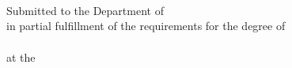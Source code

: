 \begin{titlepage}
    \begin{addmargin}[-1cm]{-3cm}
    \begin{center}
        \large

        \hfill

        \vfill

        \begingroup
            \color{CTtitle}{\LARGE \spacedallcaps{\myTitle}} \\ \bigskip
        \endgroup

        \spacedlowsmallcaps{\mySubtitle} \\ \bigskip

        \begingroup
          \color{CTtitle} \\ \bigskip
        \endgroup

        \spacedallcaps{\large \myName}



        \vfill

        
        \vspace{2em}
        Submitted to the Department of \myDepartment\\
        in partial fulfillment of the requirements for the degree of\\[1em]
        \spacedallcaps{\myDegree}\\[0.5em]
        at the\\[0.5em]
        \spacedallcaps{\myUni}\\[1em]

        \myTime

        \vfill

    \end{center}
  \end{addmargin}
\end{titlepage}
